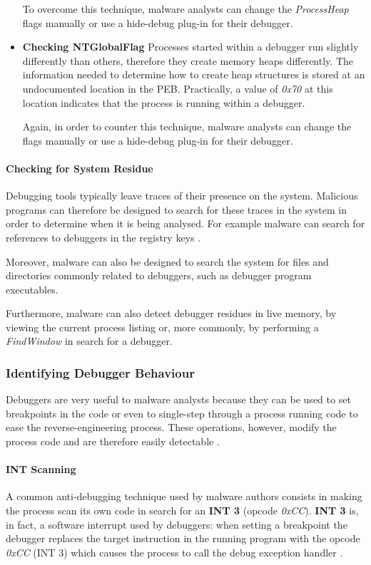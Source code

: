 \documentclass[pdfa%
,cucitura%
]{toptesi}
\begin{document}
\begin{itemize}
	To overcome this technique, malware analysts can change the \textit{ProcessHeap} flags manually or use a hide-debug plug-in for their debugger.
	
	\item \textbf{Checking NTGlobalFlag}
	Processes started within a debugger run slightly differently than others, therefore they create memory heaps differently. The information needed to determine how to create heap structures is stored at an undocumented location in the PEB. Practically, a value of \textit{0x70} at this location indicates that the process is running within a debugger.
	
	Again, in order to counter this technique, malware analysts can change the flags manually or use a hide-debug plug-in for their debugger.
	
\end{itemize}

\paragraph{Checking for System Residue}
Debugging tools typically leave traces of their presence on the system. Malicious programs can therefore be designed to search for these traces in the system in order to determine when it is being analysed. For example malware can search for references to debuggers in the registry keys \cite{SikorskiPMA}.

Moreover, malware can also be designed to search the system for files and directories commonly related to debuggers, such as debugger program executables.

Furthermore, malware can also detect debugger residues in live memory, by viewing the current process listing or, more commonly, by performing a \textit{FindWindow} in search for a debugger.

\subsubsection{Identifying Debugger Behaviour}
Debuggers are very useful to malware analysts because they can be used to set breakpoints in the code or even to single-step through a process running code to ease the reverse-engineering process. These operations, however, modify the process code and are therefore easily detectable \cite{SikorskiPMA}.

\paragraph{INT Scanning}
A common anti-debugging technique used by malware authors consists in making the process scan its own code in search for an \textbf{INT 3} (opcode \textit{0xCC}). \textbf{INT 3} is, in fact, a software interrupt used by debuggers: when setting a breakpoint the debugger replaces the target instruction in the running program with the opcode \textit{0xCC} (INT 3) which causes the process to call the debug exception handler \cite{SikorskiPMA}.
\end{document}
